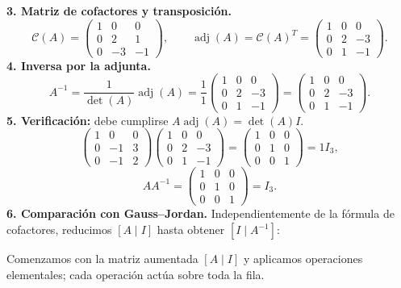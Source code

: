 \documentclass[12pt]{article}
\theoremstyle{remark}
\newcommand{\adj}{\operatorname{adj}}
\begin{document}
\textbf{3. Matriz de cofactores y transposición.}
\[
\mathcal{C}(A)=\begin{pmatrix}1&0&0\\0&2&1\\0&-3&-1\end{pmatrix},\qquad\adj(A)=\mathcal{C}(A)^T=\begin{pmatrix}1&0&0\\0&2&-3\\0&1&-1\end{pmatrix}.
\]
\textbf{4. Inversa por la adjunta.}
\[
A^{-1}=\frac1{\det(A)}\adj(A)=\frac1{1}\begin{pmatrix}1&0&0\\0&2&-3\\0&1&-1\end{pmatrix}=\begin{pmatrix}1&0&0\\0&2&-3\\0&1&-1\end{pmatrix}.
\]
\textbf{5. Verificación:} debe cumplirse $A\adj(A)=\det(A)I$.
\[
\begin{pmatrix}1&0&0\\0&-1&3\\0&-1&2\end{pmatrix}\begin{pmatrix}1&0&0\\0&2&-3\\0&1&-1\end{pmatrix}=\begin{pmatrix}1&0&0\\0&1&0\\0&0&1\end{pmatrix}=1I_{3},
\]
\[
AA^{-1}=\begin{pmatrix}1&0&0\\0&1&0\\0&0&1\end{pmatrix}=I_{3}.
\]
\textbf{6. Comparación con Gauss--Jordan.} Independientemente de la fórmula de cofactores, reducimos $[A\mid I]$ hasta obtener $[I\mid A^{-1}]$:

Comenzamos con la matriz aumentada $[A\mid I]$ y aplicamos operaciones elementales; cada operación actúa sobre toda la fila.
\end{document}
